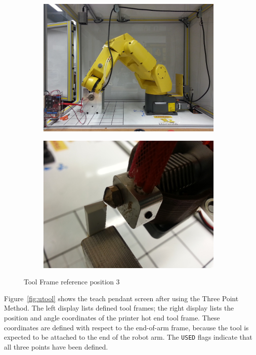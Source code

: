 \begin{figure}
    \centering
    \begin{subfigure}{.5\textwidth}
        \centering
        \includegraphics[width=.8\linewidth]{figures/tool-pt-3}
    \end{subfigure}%
    \begin{subfigure}{.5\textwidth}
        \centering
        \includegraphics[width=.8\linewidth]{figures/tool-pt-3-close}
    \end{subfigure}
    \caption{Tool Frame reference position 3}
    \label{fig:tool-pt-3}
\end{figure}

Figure~\ref{fig:utool} shows the teach pendant screen after using the Three Point Method. The left display lists defined tool frames; the right display lists the position and angle coordinates of the printer hot end tool frame. These coordinates are defined with respect to the end-of-arm frame, because the tool is expected to be attached to the end of the robot arm. The \verb|USED| flags indicate that all three points have been defined. 

